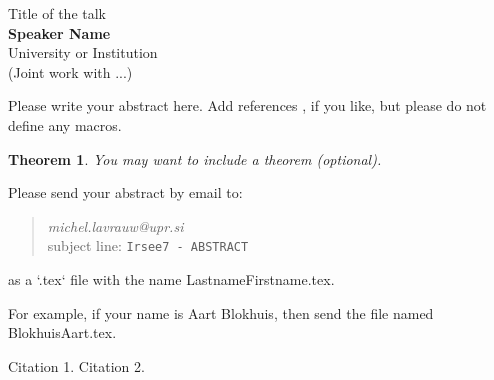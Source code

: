 \documentclass[11pt,a4paper]{article}
\newtheorem{theorem}{Theorem}
\begin{document}
\begin{center}
{\Large Title of the talk} \\[3mm]
\textbf{Speaker Name} \\[3mm]
University or Institution \\[3mm]
(Joint work with ...)
\end{center}

\vspace{2mm}

Please write your abstract here. Add references \cite{c1}, \cite{c2} if you like, but please do not define any macros.

\begin{theorem}
You may want to include a theorem (optional).
\end{theorem}

\vspace{4mm}

\noindent
Please send your abstract by email to:

\begin{quote}
\textit{michel.lavrauw@upr.si} \\
subject line: \texttt{Irsee7 - ABSTRACT}
\end{quote}

as a `.tex` file with the name LastnameFirstname.tex.

For example, if your name is Aart Blokhuis, then send the file named BlokhuisAart.tex.

\vspace{4mm}

\begin{thebibliography}{99}
 Citation 1.
 Citation 2.
\end{thebibliography}
\end{document}
